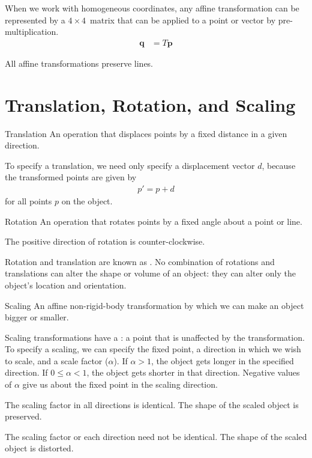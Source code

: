 \documentclass[../COS3712_Notes.tex]{subfiles}
\begin{document}
      When we work with homogeneous coordinates, any affine transformation can be represented
      by a $4 \times 4$~matrix that can be applied to a point or vector by pre-multiplication.
      \begin{align*}
        \mathbf{q} &= T\mathbf{p}
      \end{align*}

      All affine transformations preserve lines.

    \section{Translation, Rotation, and Scaling}
      \begin{definition}{Translation}
        An operation that displaces points by a fixed distance in a given direction.

        To specify a translation, we need only specify a displacement vector $d$,
        because the transformed points are given by
        \begin{align*}
          p' = p + d
        \end{align*}
        for all points $p$ on the object.
      \end{definition}

      \begin{definition}{Rotation}
        An operation that rotates points by a fixed angle about a point or line.

        The positive direction of rotation is counter-clockwise.
      \end{definition}

      Rotation and translation are known as .
      No combination of rotations and translations can alter the shape or volume of an object:
      they can alter only the object's location and orientation.

      \pagebreak

      \begin{definition}{Scaling}
        An affine non-rigid-body transformation by which we can make an object bigger or smaller.

        Scaling transformations have a : a point that is unaffected by the
        transformation.
        To specify a scaling, we can specify the fixed point, a direction in which we wish to scale,
        and a scale factor ($\alpha$).
        If $\alpha > 1$, the object gets longer in the specified direction.
        If $0 \leq \alpha < 1$, the object gets shorter in that direction.
        Negative values of $\alpha$ give us  about the fixed point
        in the scaling direction.
        \begin{descriptimize}
          \item[Uniform Scaling] The scaling factor in all directions is identical.
            The shape of the scaled object is preserved.
          \item[Non-uniform Scaling] The scaling factor or each direction need not be identical.
            The shape of the scaled object is distorted.
        \end{descriptimize}
      \end{definition}
\end{document}
